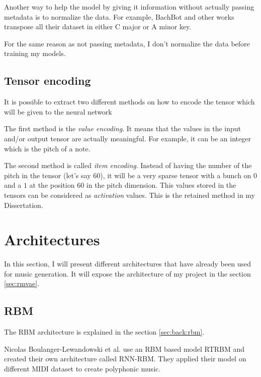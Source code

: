 \documentclass[12pt]{report}
\begin{document}
\bigskip

Another way to help the model by giving it information without actually passing metadata is to normalize the data.
For example, BachBot \cite{liang_automatic_2017} and other works \cite{chuan_modeling_nodate, boulanger-lewandowski_modeling_2012} transpose all their dataset in either C major or A minor key.

For the same reason as not passing metadata, I don't normalize the data before training my models.


\subsection{Tensor encoding}

It is possible to extract two different methods on how to encode the tensor which will be given to the neural network

The first method is the \textit{value encoding}.
It means that the values in the input and/or output tensor are actually meaningful.
For example, it can be an integer which is the pitch of a note.

The second method is called \textit{item encoding}.
Instead of having the number of the pitch in the tensor (let's say $60$), it will be a very sparse tensor with a bunch on $0$ and a $1$ at the position $60$ in the pitch dimension.
This values stored in the tensors can be considered as \textit{activation} values.
This is the retained method in my Dissertation.


\section{Architectures}


In this section, I will present different architectures that have already been used for music generation. It will expose the architecture of my project in the section \ref{sec:rmvae}.


\subsection{RBM}

The RBM architecture is explained in the section \ref{sec:back:rbm}.

Nicolas Boulanger-Lewandowski et al. \cite{boulanger-lewandowski_modeling_2012} use an RBM based model RTRBM \cite{sutskever_recurrent_nodate, mittelman_structured_nodate} and created their own architecture called RNN-RBM.
They applied their model on different MIDI dataset to create polyphonic music.
\end{document}

